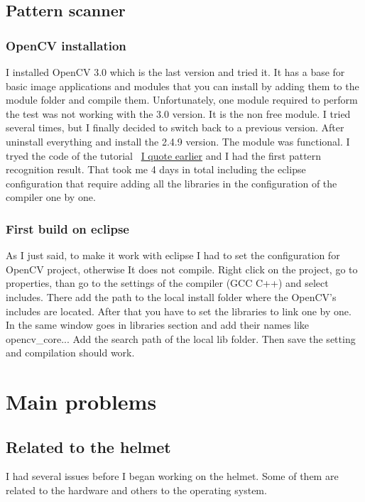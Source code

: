 	\subsection{Pattern scanner}
	\subsubsection{OpenCV installation}

	\par I installed OpenCV 3.0 which is the last version and tried it. It has a base for basic image applications and modules that you can install by adding them to the module folder and compile them. Unfortunately, one module required to perform the test was not working with the 3.0 version. It is the non free module. I tried several times, but I finally decided to switch back to a previous version. After uninstall everything and install the 2.4.9 version. The module was functional. I tryed the code of the tutorial ~\hyperlink{opencv}{I quote earlier} and I had the first pattern recognition result. That took me 4 days in total including the eclipse configuration that require adding all the libraries in the configuration of the compiler one by one.
	
	\subsubsection{First build on eclipse}	
	
	\par As I just said, to make it work with eclipse I had to set the configuration for OpenCV project, otherwise It does not compile. Right click on the project, go to properties, than go to the settings of the compiler (GCC  C++) and select includes. There add the path to the local install folder where the OpenCV's includes are located. After that you have to set the libraries to link one by one. In the same window goes in libraries section and add their names like opencv\_core... Add the search path of the local lib folder. Then save the setting and compilation should work.
	
	
	\section{Main problems}	
	\subsection{Related to the helmet}
	\par I had several issues before I began working on the helmet. Some of them are related to the hardware and others to the operating system.
